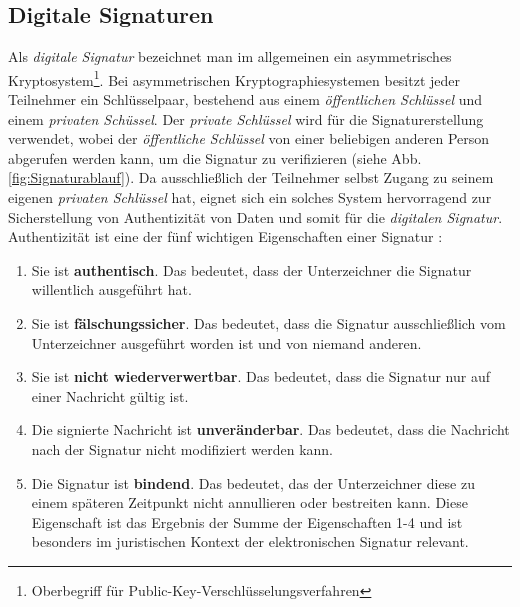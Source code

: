 \documentclass[11pt,a4paper,ngerman]{scrreprt}
\begin{document}
\subsection{Digitale Signaturen}
Als \textit{digitale Signatur} bezeichnet man im allgemeinen ein asymmetrisches Kryptosystem\footnote{Oberbegriff für Public-Key-Verschlüsselungsverfahren}. Bei asymmetrischen Kryptographiesystemen besitzt jeder Teilnehmer ein Schlüsselpaar, bestehend aus einem \emph{öffentlichen Schlüssel} und einem \emph{privaten Schüssel}. Der \emph{private Schlüssel} wird für die Signaturerstellung verwendet, wobei der \emph{öffentliche Schlüssel} von einer beliebigen anderen Person abgerufen werden kann, um die Signatur zu verifizieren (siehe Abb. \ref{fig:Signaturablauf}). Da ausschließlich der Teilnehmer selbst Zugang zu seinem eigenen \emph{privaten Schlüssel} hat, eignet sich ein solches System hervorragend zur Sicherstellung von Authentizität von Daten und somit für die \textit{digitalen Signatur}. Authentizität ist eine der fünf wichtigen Eigenschaften einer Signatur \cite{sch05}:
\begin{enumerate}
    \item Sie ist \textbf{authentisch}. Das bedeutet, dass der Unterzeichner die Signatur willentlich ausgeführt hat.
    \item Sie ist \textbf{fälschungssicher}. Das bedeutet, dass die Signatur ausschließlich vom Unterzeichner ausgeführt worden ist und von niemand anderen.
    \item Sie ist \textbf{nicht wiederverwertbar}. Das bedeutet, dass die Signatur nur auf einer Nachricht gültig ist.
    \item Die signierte Nachricht ist \textbf{unveränderbar}. Das bedeutet, dass die Nachricht nach der Signatur nicht modifiziert werden kann.
    \item Die Signatur ist \textbf{bindend}. Das bedeutet, das der Unterzeichner diese zu einem späteren Zeitpunkt nicht annullieren oder bestreiten kann. Diese Eigenschaft ist das Ergebnis der Summe der Eigenschaften 1-4 und ist besonders im juristischen Kontext der elektronischen Signatur relevant.
\end{enumerate}
\end{document}
